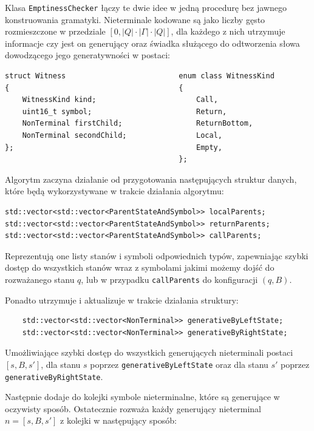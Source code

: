 Klasa \texttt{EmptinessChecker} łączy te dwie idee w jedną procedurę bez jawnego konstruowania gramatyki.
Nieterminale kodowane są jako liczby gęsto rozmieszczone w przedziale $[0, |Q| \cdot |\Gamma| \cdot |Q|]$,
dla każdego z nich utrzymuje informacje czy jest on generujący oraz świadka służącego do odtworzenia
słowa dowodzącego jego generatywności w postaci:
\begin{verbatim}
struct Witness                          enum class WitnessKind    
{                                       {
    WitnessKind kind;                       Call,
    uint16_t symbol;                        Return,
    NonTerminal firstChild;                 ReturnBottom,
    NonTerminal secondChild;                Local,
};                                          Empty,
                                        };
\end{verbatim}

Algorytm zaczyna działanie od przygotowania następujących struktur danych, które będą wykorzystywane w trakcie działania algorytmu:
\begin{verbatim}
std::vector<std::vector<ParentStateAndSymbol>> localParents;
std::vector<std::vector<ParentStateAndSymbol>> returnParents;
std::vector<std::vector<ParentStateAndSymbol>> callParents;
\end{verbatim}

Reprezentują one listy stanów i symboli odpowiednich typów, zapewniając szybki dostęp do wszystkich stanów wraz z symbolami jakimi możemy dojść
do rozważanego stanu $q$, lub w przypadku \texttt{callParents} do konfiguracji $(q, B)$.

Ponadto utrzymuje i aktualizuje w trakcie działania struktury:
\begin{verbatim}
    std::vector<std::vector<NonTerminal>> generativeByLeftState;
    std::vector<std::vector<NonTerminal>> generativeByRightState;
\end{verbatim}

Umożliwiające szybki dostęp do wszystkich generujących nieterminali postaci $[s, B, s']$, dla stanu $s$ poprzez \texttt{generativeByLeftState} oraz
dla stanu $s'$ poprzez \texttt{generativeByRightState}.

Następnie dodaje do kolejki symbole nieterminalne, które są generujące w oczywisty sposób. Ostatecznie rozważa każdy
generujący nieterminal $n = [s, B, s']$ z kolejki w następujący sposób:

